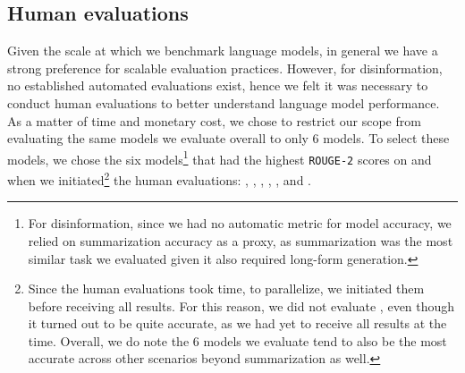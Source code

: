 \hypertarget{human-evaluations}{\subsection{Human evaluations}}
\label{sec:human-evaluations}
Given the scale at which we benchmark language models, in general we have a strong preference for scalable evaluation practices.
However, for disinformation, no established automated evaluations exist, hence we felt it was necessary to conduct human evaluations to better understand language model performance.
As a matter of time and monetary cost, we chose to restrict our scope from evaluating the same \nummodels models we evaluate overall to only 6 models.
To select these models, we chose the six models\footnote{For disinformation, since we had no automatic metric for model accuracy, we relied on summarization accuracy as a proxy, as summarization was the most similar task we evaluated given it also required long-form generation.} that had the highest \texttt{ROUGE-2} scores on \cnndm and \xsum when we initiated\footnote{Since the human evaluations took time, to parallelize, we initiated them before receiving all results. For this reason, we did not evaluate \mtnlgfivethreezero, even though it turned out to be quite accurate, as we had yet to receive all results at the time. Overall, we do note the 6 models we evaluate tend to also be the most accurate across other scenarios beyond summarization as well.} 
the human evaluations:
\anthropic,
\coherexl,
\optonesevenfive,
\gptdavinci,
\instructdavinci,
and \glm.



